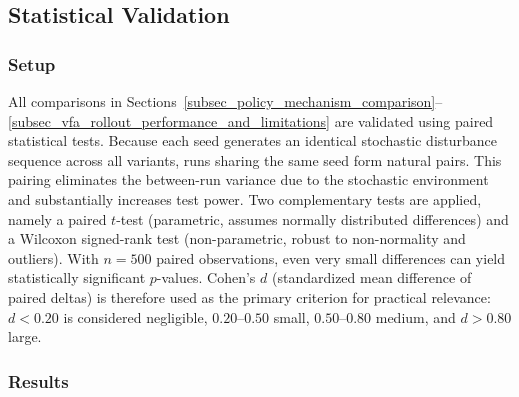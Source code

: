 \documentclass[12pt,oneside]{article}
\begin{document}
\subsection{Statistical Validation}\label{subsec_statistical_validation}

\subsubsection*{Setup}

All comparisons in Sections~\ref{subsec_policy_mechanism_comparison}--\ref{subsec_vfa_rollout_performance_and_limitations} are validated using paired statistical tests. Because each seed generates an identical stochastic disturbance sequence across all variants, runs sharing the same seed form natural pairs. This pairing eliminates the between-run variance due to the stochastic environment and substantially increases test power. Two complementary tests are applied, namely a paired $t$-test (parametric, assumes normally distributed differences) and a Wilcoxon signed-rank test (non-parametric, robust to non-normality and outliers). With $n = 500$ paired observations, even very small differences can yield statistically significant $p$-values. Cohen's $d$ (standardized mean difference of paired deltas) is therefore used as the primary criterion for practical relevance: $d < 0.20$ is considered negligible, $0.20$--$0.50$ small, $0.50$--$0.80$ medium, and $d > 0.80$ large.

\subsubsection*{Results}
\end{document}
